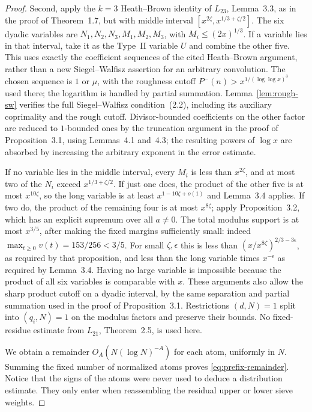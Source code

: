 \begin{proof}
Second, apply the $k=3$ Heath--Brown identity of $L_{23}$,
Lemma~3.3, as in the proof of Theorem~1.7, but with middle interval
$[x^{2\zeta},x^{1/3+\zeta/2}]$. The six dyadic variables are
$N_1,N_2,N_3,M_1,M_2,M_3$, with $M_i\le(2x)^{1/3}$.
If a variable lies in that interval, take it as the Type~II variable
$U$ and combine the other five. This uses exactly the coefficient
sequences of the cited Heath--Brown argument, rather than a new
Siegel--Walfisz assertion for an arbitrary convolution. The chosen
sequence is $1$ or $\mu$, with the roughness cutoff
$P^-(n)>x^{1/(\log\log x)^3}$ used there; the logarithm is handled
by partial summation. Lemma~\ref{lem:rough-sw} verifies the full
Siegel--Walfisz condition~(2.2), including its auxiliary coprimality
and the rough cutoff. Divisor-bounded
coefficients on the other factor are reduced to $1$-bounded ones
by the truncation argument in the proof of Proposition~3.1, using
Lemmas~4.1 and~4.3; the resulting powers of $\log x$ are absorbed
by increasing the arbitrary exponent in the error estimate.

If no variable lies in the middle interval, every $M_i$ is less
than $x^{2\zeta}$, and at most two of the $N_i$ exceed
$x^{1/3+\zeta/2}$. If just one does, the product of the other five
is at most $x^{10\zeta}$, so the long variable is at least
$x^{1-10\zeta+o(1)}$ and Lemma~3.4 applies. If two do, the
product of the remaining four is at most $x^{8\zeta}$; apply
Proposition~3.2, which has an explicit supremum over all $a\ne0$.
The total modulus support is at most $x^{3/5}$, after making the
fixed margins sufficiently small: indeed $\max_{t\ge0}v(t)
=153/256<3/5$. For small $\zeta,\epsilon$ this is less than
$(x/x^{8\zeta})^{2/3-3\epsilon}$, as required by that proposition,
and less than the long variable times $x^{-\epsilon}$ as required
by Lemma~3.4. Having no large variable is impossible because the
product of all six variables is comparable with $x$.
These arguments also allow the sharp product cutoff on a dyadic
interval, by the same separation and partial summation used in
the proof of Proposition~3.1. Restrictions $(d,N)=1$ split into
$(q_i,N)=1$ on the modulus factors and preserve their bounds.
No fixed-residue estimate from $L_{21}$, Theorem~2.5, is used here.

We obtain a remainder $O_A(N(\log N)^{-A})$ for each atom, uniformly
in $N$. Summing the fixed number of normalized atoms proves
\eqref{eq:prefix-remainder}. Notice that the signs of the atoms were
never used to deduce a distribution estimate. They only enter when
reassembling the residual upper or lower sieve weights.


\end{proof}
